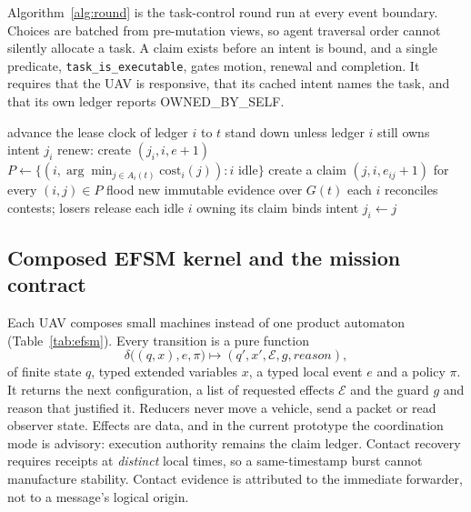 \documentclass[conference]{IEEEtran}
\newcommand{\stt}[1]{\textsf{#1}}     %
\newcommand{\code}[1]{\texttt{#1}}    %
\begin{document}
Algorithm~\ref{alg:round} is the task-control round run at every event
boundary. Choices are batched from pre-mutation views, so agent traversal
order cannot silently allocate a task. A claim exists before an intent is
bound, and a single predicate, \code{task\_is\_executable}, gates motion,
renewal and completion. It requires that the UAV is responsive, that its
cached intent names the task, and that its own ledger reports
\stt{OWNED\_BY\_SELF}.

\begin{algorithm}[t]
\caption{Receiver-local task-control round at time $t$}
\label{alg:round}
\begin{algorithmic}[1]
  \State advance the lease clock of ledger $i$ to $t$
  \State stand down unless ledger $i$ still owns intent $j_i$
    \State renew: create $(j_i,i,e+1)$
  \EndIf
\EndFor
\Repeat
  \State $P\gets\{(i,\arg\min_{j\in A_i(t)}\mathrm{cost}_i(j)) : i \text{ idle}\}$
  \State create a claim $(j,i,e_{ij}+1)$ for every $(i,j)\in P$
  \State flood new immutable evidence over $G(t)$
  \State each $i$ reconciles contests; losers release
  \State each idle $i$ owning its claim binds intent $j_i\gets j$
\end{algorithmic}
\end{algorithm}

\subsection{Composed EFSM kernel and the mission contract}
\label{sec:efsm}

Each UAV composes small machines instead of one product automaton
(Table~\ref{tab:efsm}). Every transition is a pure function
\begin{equation*}
  \delta\bigl((q,x),e,\pi\bigr)\mapsto(q',x',\mathcal{E},g,\mathit{reason}),
\end{equation*}
of finite state $q$, typed extended variables $x$, a typed local event $e$ and
a policy $\pi$. It returns the next configuration, a list of requested effects
$\mathcal{E}$ and the guard $g$ and reason that justified it. Reducers never
move a vehicle, send a packet or read observer state. Effects are data, and
in the current prototype the coordination mode is advisory: execution
authority remains the claim ledger. Contact recovery requires receipts at
\emph{distinct} local times, so a same-timestamp burst cannot manufacture
stability. Contact evidence is attributed to the immediate forwarder, not to
a message's logical origin.
\end{document}
